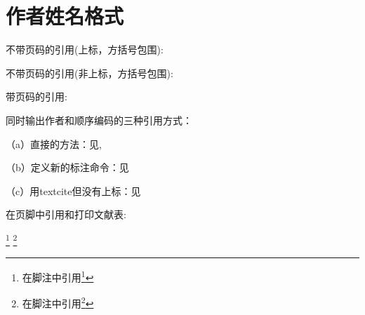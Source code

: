 \documentclass[twoside]{article}
\begin{document}
    \section{作者姓名格式}
    
 不带页码的引用(上标，方括号包围):
 \cite{FOURNEY1971-17-38}\cite{wang2006another}
 
 不带页码的引用(非上标，方括号包围):
 \parencite{FOURNEY1971-17-38}\parencite{wang2006another}
 
 带页码的引用:
 \cite[见][49页]{FOURNEY1971-17-38} \parencite[见][49页]{wang2006another}

 
 同时输出作者和顺序编码的三种引用方式：
 
（a）直接的方法：见\citeauthor{FOURNEY1971-17-38}\cite{FOURNEY1971-17-38}, \citeauthor{wang2006another}\cite{wang2006another}

（b）定义新的标注命令：见

（c）用textcite但没有上标：见\textcite{FOURNEY1971-17-38,wang2006another}

 在页脚中引用和打印文献表:

 \footnote{在脚注中引用\footcite{FOURNEY1971-17-38}} 
 \footnote{在脚注中引用\footcite{wang2006another}} 

 \nocite{*}

    \printbibliography[category=kindsofnameformats,title=五种不同的姓名格式]

    \printbibliography[notcategory=kindsofnameformats,title=某种期刊的姓名格式]

    
\end{document}
